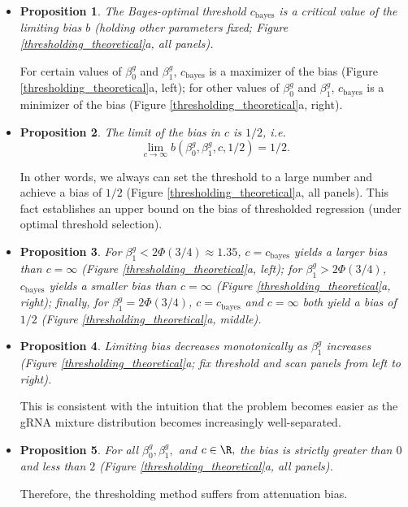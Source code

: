 \documentclass[12pt]{article}
\newtheorem{proposition}{Proposition}
\begin{document}
\begin{itemize}
\item \begin{proposition}
The Bayes-optimal threshold $c_\textrm{bayes}$ is a critical value of the limiting bias $b$ (holding other parameters fixed; Figure \ref{thresholding_theoretical}a, all panels).
\end{proposition}
For certain values of $\beta^g_0$ and $\beta^g_1$, $c_\textrm{bayes}$ is a maximizer of the bias (Figure \ref{thresholding_theoretical}a, left); for other values of $\beta^g_0$ and $\beta^g_1$, $c_\textrm{bayes}$ is a minimizer of the bias (Figure \ref{thresholding_theoretical}a, right).
\item
\begin{proposition}
The limit of the bias in $c$ is $1/2$, i.e. 
$$\lim_{c \to \infty} b(\beta^g_0, \beta^g_1, c, 1/2) = 1/2.$$
\end{proposition}
 In other words, we always can set the threshold to a large number and achieve a bias of $1/2$ (Figure \ref{thresholding_theoretical}a, all panels). This fact establishes an upper bound on the bias of thresholded regression (under optimal threshold selection).
 \item
 \begin{proposition}
 For $\beta^g_1 < 2 \Phi(3/4) \approx 1.35$, $c = c_\textrm{bayes}$ yields a \textit{larger} bias than $c = \infty$ (Figure \ref{thresholding_theoretical}a, left); for $\beta^g_1 > 2 \Phi(3/4)$, $c_\textrm{bayes}$ yields a \textit{smaller} bias than $c = \infty$ (Figure \ref{thresholding_theoretical}a, right); finally, for $\beta^g_1 = 2 \Phi(3/4)$, $c = c_\textrm{bayes}$ and $c = \infty$ both yield a bias of $1/2$ (Figure \ref{thresholding_theoretical}a, middle).
 \end{proposition}
\item \begin{proposition}
Limiting bias decreases monotonically as $\beta_1^g$ increases (Figure \ref{thresholding_theoretical}a; fix threshold and scan panels from left to right).
\end{proposition}
This is consistent with the intuition that the problem becomes easier as the gRNA mixture distribution becomes increasingly well-separated.
\item 
\begin{proposition} For all $\beta^g_0, \beta^g_1,$ and $c \in \R,$ the bias is strictly greater than $0$ and less than $2$ (Figure \ref{thresholding_theoretical}a, all panels). 
\end{proposition}
Therefore, the thresholding method suffers from attenuation bias.
\end{itemize}
\end{document}
